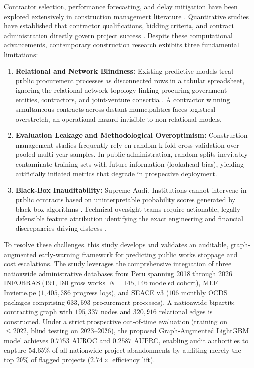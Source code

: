 \documentclass[10pt,a4paper]{article}
\begin{document}
Contractor selection, performance forecasting, and delay mitigation have been explored extensively in construction management literature \citep{akcay2018fuzzy, bageis2009factors, banaitiene2006analysis, darvish2009application, elsawalhi2007contractor, enshassi2013contractors}. Quantitative studies have established that contractor qualifications, bidding criteria, and contract administration directly govern project success \citep{fong2000final, holt2010contractor, holt1994factors, holt1995review, haseeb2011causes, gondia2020machine, sannianibire2020predictive, ahmad2020tree}. Despite these computational advancements, contemporary construction research exhibits three fundamental limitations:
\begin{enumerate}
    \item \textbf{Relational and Network Blindness:} Existing predictive models treat public procurement processes as disconnected rows in a tabular spreadsheet, ignoring the relational network topology linking procuring government entities, contractors, and joint-venture consortia \citep{cheng2004contractor, elabbasy2013contractor, fazekas2018comprehensive, wachs2021corruption}. A contractor winning simultaneous contracts across distant municipalities faces logistical overstretch, an operational hazard invisible to non-relational models.
    \item \textbf{Evaluation Leakage and Methodological Overoptimism:} Construction management studies frequently rely on random k-fold cross-validation over pooled multi-year samples. In public administration, random splits inevitably contaminate training sets with future information (lookahead bias), yielding artificially inflated metrics that degrade in prospective deployment.
    \item \textbf{Black-Box Inauditability:} Supreme Audit Institutions cannot intervene in public contracts based on uninterpretable probability scores generated by black-box algorithms \citep{wachter2017counterfactual, rudin2019stop}. Technical oversight teams require actionable, legally defensible feature attribution identifying the exact engineering and financial discrepancies driving distress \citep{lundberg2020local}.
\end{enumerate}

To resolve these challenges, this study develops and validates an auditable, graph-augmented early-warning framework for predicting public works stoppage and cost escalations. The study leverages the comprehensive integration of three nationwide administrative databases from Peru spanning 2018 through 2026: INFOBRAS ($191,180$ gross works; $N = 145,146$ modeled cohort), MEF Invierte.pe ($1,405,386$ progress logs), and SEACE v3 ($106$ monthly OCDS packages comprising $633,593$ procurement processes). A nationwide bipartite contracting graph with $195,337$ nodes and $320,916$ relational edges is constructed. Under a strict prospective out-of-time evaluation (training on $\le 2022$, blind testing on $2023$--$2026$), the proposed Graph-Augmented LightGBM model achieves $0.7753$ AUROC and $0.2587$ AUPRC, enabling audit authorities to capture $54.65\%$ of all nationwide project abandonments by auditing merely the top $20\%$ of flagged projects ($2.74\times$ efficiency lift).
\end{document}
